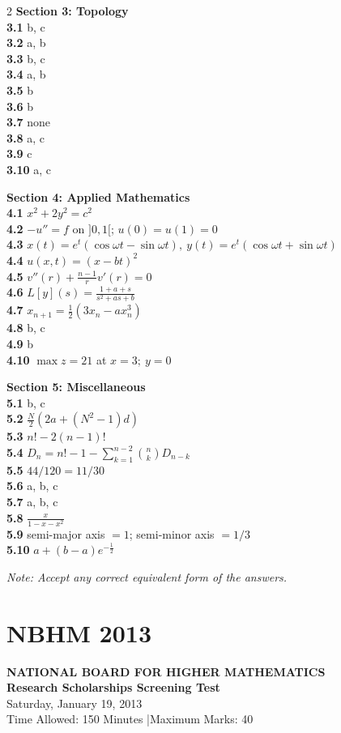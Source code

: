 \documentclass[11pt,a4paper]{article}
\newcommand{\examheader}[4]{%
  \clearpage
  \section{#1}
  \begin{center}
    {\large\bfseries NATIONAL BOARD FOR HIGHER MATHEMATICS}\\[3pt]
    {\bfseries #2}\\[2pt]
    {#3}\\[2pt]
    {\small #4}
  \end{center}
  \vspace{4pt}
}
\begin{document}
\begin{multicols}{2}
\medskip
\textbf{Section 3: Topology}\\
\textbf{3.1} b, c\\
\textbf{3.2} a, b\\
\textbf{3.3} b, c\\
\textbf{3.4} a, b\\
\textbf{3.5} b\\
\textbf{3.6} b\\
\textbf{3.7} none\\
\textbf{3.8} a, c\\
\textbf{3.9} c\\
\textbf{3.10} a, c

\medskip
\textbf{Section 4: Applied Mathematics}\\
\textbf{4.1} $x^2 + 2y^2 = c^2$\\
\textbf{4.2} $-u'' = f$ on $]0, 1[$; $u(0) = u(1) = 0$\\
\textbf{4.3} $x(t) = e^t(\cos\omega t - \sin\omega t),\ y(t) = e^t(\cos\omega t + \sin\omega t)$\\
\textbf{4.4} $u(x, t) = (x - bt)^2$\\
\textbf{4.5} $v''(r) + \frac{n-1}{r}v'(r) = 0$\\
\textbf{4.6} $L[y](s) = \frac{1 + a + s}{s^2 + as + b}$\\
\textbf{4.7} $x_{n+1} = \frac{1}{2}(3x_n - ax_n^3)$\\
\textbf{4.8} b, c\\
\textbf{4.9} b\\
\textbf{4.10} $\max z = 21$ at $x = 3;\ y = 0$

\medskip
\textbf{Section 5: Miscellaneous}\\
\textbf{5.1} b, c\\
\textbf{5.2} $\frac{N}{2}(2a + (N^2 - 1)d)$\\
\textbf{5.3} $n! - 2(n-1)!$\\
\textbf{5.4} $D_n = n! - 1 - \sum_{k=1}^{n-2} \binom{n}{k} D_{n-k}$\\
\textbf{5.5} $44/120 = 11/30$\\
\textbf{5.6} a, b, c\\
\textbf{5.7} a, b, c\\
\textbf{5.8} $\frac{x}{1 - x - x^2}$\\
\textbf{5.9} semi-major axis $= 1$; semi-minor axis $= 1/3$\\
\textbf{5.10} $a + (b - a)e^{-\frac{1}{2}}$

\medskip
\noindent\emph{Note: Accept any correct equivalent form of the answers.}
\end{multicols}
\examheader{NBHM 2013}{Research Scholarships Screening Test}{Saturday, January 19, 2013}{Time Allowed: 150 Minutes \quad|\quad Maximum Marks: 40}
\end{document}
